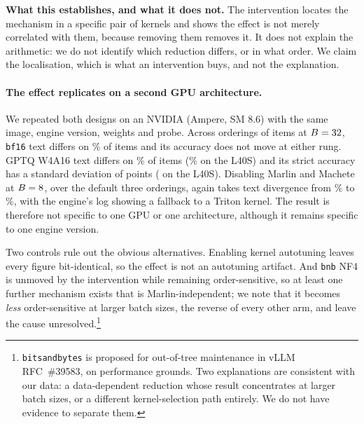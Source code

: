 \documentclass[11pt]{article}
\begin{document}
\textbf{What this establishes, and what it does not.} The intervention locates the
mechanism in a specific pair of kernels and shows the effect is not merely correlated with
them, because removing them removes it. It does not explain the arithmetic: we do not
identify which reduction differs, or in what order. We claim the localisation, which is what
an intervention buys, and not the explanation.

\paragraph{The effect replicates on a second GPU architecture.}
We repeated both designs on an NVIDIA \hEightSpotGPU{} (Ampere, SM 8.6) with the same
image, engine version, weights and probe. Across \hEightSpotOrderings{} orderings of
\hEightSpotItems{} items at $B=32$, \texttt{bf16} text differs on
\hEightSpotBFText\% of items and its accuracy does not move at either rung. GPTQ W4A16
text differs on \hEightSpotText\% of items (\hEightTenText\% on the L40S) and its
strict accuracy has a standard deviation of \hEightSpotSD{} points (\hEightTenSD{} on the
L40S). Disabling Marlin and Machete at $B=8$, over the default three
orderings, again takes text divergence from \hEightSpotMarlinOn\% to
\hEightSpotMarlinOff\%, with the engine's log showing a fallback to a Triton kernel. The result is therefore not specific to one GPU or one architecture,
although it remains specific to one engine version.

\begin{table}[t]
\centering
\small

\caption{Paired intervention at $B=8$: identical inputs, identical engine, with
and without the Marlin and Machete kernels. Text divergence and accuracy SD in
percentage points. bitsandbytes NF4 is unaffected at exactly $1.00\times$
because it never used these kernels, so its ordering sensitivity has a second and distinct
cause.}
\label{tab:h8-mechanism}
\end{table}

Two controls rule out the obvious alternatives. Enabling kernel autotuning
leaves every figure bit-identical, so the effect is not an autotuning artifact.
And \texttt{bnb} NF4 is unmoved by the intervention while remaining
order-sensitive, so at least one further mechanism exists that is
Marlin-independent; we note that it becomes \emph{less} order-sensitive at
larger batch sizes, the reverse of every other arm, and leave the cause
unresolved.\footnote{\texttt{bitsandbytes} is proposed for out-of-tree
maintenance in vLLM RFC~\#39583, on performance grounds. Two explanations are
consistent with our data: a data-dependent reduction whose result
concentrates at larger batch sizes, or a different kernel-selection path
entirely. We do not have evidence to separate them.}
\end{document}

